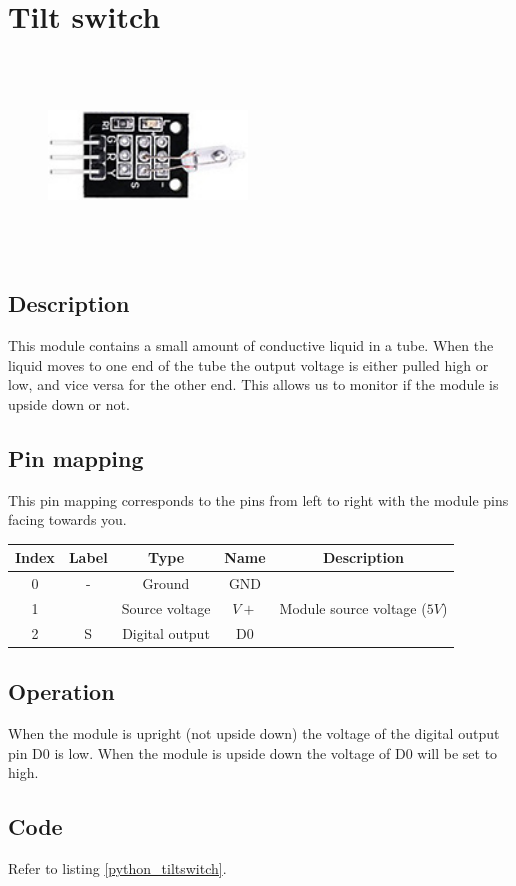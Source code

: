 \section{Tilt switch}
\begin{figure}[H]
    \centering
    \includegraphics[angle=0, keepaspectratio=true, scale=1, width=200px, height=200px]{images/tilt.jpg}
\end{figure}
\subsection*{Description}
This module contains a small amount of conductive liquid in a tube. When the liquid moves to one end of the tube the output voltage is either pulled high or low, and vice versa for the other end. This allows us to monitor if the module is upside down or not.
\subsection*{Pin mapping}
This pin mapping corresponds to the pins from left to right with the module pins facing towards you.
\begin{table}[H]
    \centering
    \begin{tabular}{|c|c|c|c|c|}
    \hline
    Index &Label &Type &Name &Description\\ \hline
    0 &- &Ground &GND &\\ \hline
    1 & &Source voltage &$V+$ &Module source voltage ($5V$)\\ \hline
    2 &S &Digital output &D0 &\\ \hline
    \end{tabular}
\end{table}
\subsection*{Operation}
When the module is upright (not upside down) the voltage of the digital output pin D0 is low. When the module is upside down the voltage of D0 will be set to high.
\subsection*{Code}
Refer to listing \ref{python_tiltswitch}.
%
